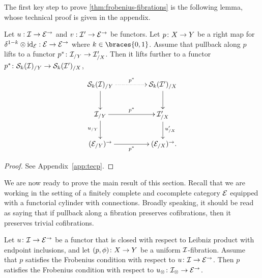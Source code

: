 \documentclass[reqno,10pt,a4paper,oneside,draft]{amsart}
\begin{document}
\medskip

The first key step to prove \cref{thm:frobenius-fibrations} is the following lemma, whose technical proof is given in the appendix.

\begin{lemma} \label{strong-h-equiv-base-change-along-fibration}
Let $u : \cal{I} \to \catE^\to$ and $v : \cal{I}' \to \catE^\to$ be functors.
Let $p \co X \to Y$ be a right map for $\kcylinv \otimes \id_{\calE} : \catE \to \catE^\to$ where $k \in \braces{0, 1}$.
Assume that pullback along $p$ lifts to a functor $p^* \co \cal{I}_{/Y} \to \cal{I}_{/X}'$.
Then it lifts further to a functor $p^* \co \cal{S}_k(\cal{I})_{/Y} \to \cal{S}_k(\cal{I}')_{/X}$,
\[
\xymatrix@C+2em{
  \cal{S}_k(\cal{I})_{/Y}
  \ar@{.>}[r]^{p^*}
  \ar[d]
&
  \cal{S}_k(\cal{I}')_{/X}
  \ar[d]
\\
  \cal{I}_{/Y}
  \ar[r]^{p^*}
  \ar[d]_{u_{/Y}}
&
  \cal{I}_{/X}'
  \ar[d]^{u_{/X}'}
\\
  (\catE_{/Y})^\to
  \ar[r]_{p^*}
&
  (\catE_{/X})^\to \rlap{.}
}
\]
\end{lemma}

\begin{proof}
See Appendix~\ref{app:tecp}.
\end{proof}

We are now ready to prove the main result of this section.
Recall that we are working in the setting of a finitely complete and cocomplete category $\catE$ equipped with a functorial cylinder with connections.
Broadly speaking, it should be read as saying that if pullback along a fibration preserves cofibrations, then it preserves trivial cofibrations.

\begin{theorem} \label{thm:frobenius-fibrations}
Let $u \co \cal{I} \to \catE^\to$ be a functor that is closed with respect to Leibniz product with endpoint inclusions, and let $(p,\phi) \co X \to Y$ be a uniform $\cal{I}$-fibration.
Assume that $p$ satisfies the Frobenius condition with respect to $u \co \cal{I} \to \catE^\to$.
Then $p$ satisfies the Frobenius condition with respect to $u_\otimes \co \cal{I}_\otimes \to \catE^\to$.
\end{theorem}
\end{document}
